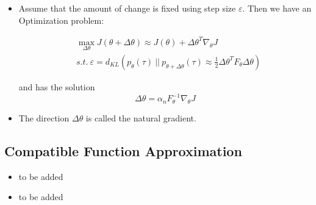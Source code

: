 {\begin{pcolumn}
{\begin{itemize}
	\item Assume that the amount of change is fixed using step size $\varepsilon$. Then we have an Optimization problem:

\begin{eqnarray}
	& \max \limits_{\Delta\theta} J(\theta + \Delta\theta) \approx J(\theta) + \Delta\theta^T \nabla_\theta J \\
	& s.t.\  \varepsilon = d_{KL}(p_\theta(\tau) \ ||\ p_{\theta+\Delta\theta} (\tau) \approx \frac{1}{2} \Delta \theta^T F_\theta \Delta \theta)   \nonumber
\end{eqnarray}

and has the solution
\begin{equation}
	\Delta \theta = \alpha_n F_\theta^{-1}\nabla_\theta J
\end{equation}
	\item The direction $\Delta \theta$ is called the natural gradient.
\end{itemize}
\vspace*{2mm}
}

\subsection{Compatible Function Approximation}
\vspace*{-17mm}
{\large
\begin{itemize}
	\item to be added \vspace{-2mm}

	\item to be added \vspace{-2mm}

	
\end{itemize}
}

\end{pcolumn}
%
\hfill
\begin{pcolumn}
%

\end{pcolumn}}
